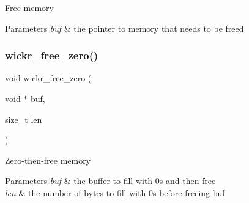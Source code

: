 Free memory


\begin{DoxyParams}{Parameters}
{\em buf} & the pointer to memory that needs to be freed \\
\hline
\end{DoxyParams}
\mbox{\label{group__memory__functions_gadad0d18d3a00f50082b6585971a62ae1}} 
\subsubsection{\texorpdfstring{wickr\+\_\+free\+\_\+zero()}{wickr\_free\_zero()}}
{\footnotesize\ttfamily void wickr\+\_\+free\+\_\+zero (\begin{DoxyParamCaption}\item[{void $\ast$}]{buf,  }\item[{size\+\_\+t}]{len }\end{DoxyParamCaption})}

Zero-\/then-\/free memory


\begin{DoxyParams}{Parameters}
{\em buf} & the buffer to fill with 0s and then free \\
\hline
{\em len} & the number of bytes to fill with 0s before freeing \textquotesingle{}buf\textquotesingle{} \\
\hline
\end{DoxyParams}

